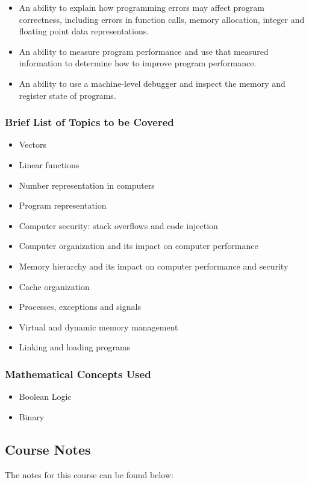 {\begin{highlight}[\CSPBCompSys]
\begin{itemize}
            \item An ability to explain how programming errors may affect program correctness, including errors in function calls, memory allocation, integer and floating point data representations.
            \item An ability to measure program performance and use that measured information to determine how to improve program performance.
            \item An ability to use a machine-level debugger and inspect the memory and register state of programs.
        \end{itemize}
        
        \subsubsection*{Brief List of Topics to be Covered}

        \begin{itemize}
            \item Vectors
            \item Linear functions
            \item Number representation in computers
            \item Program representation
            \item Computer security: stack overflows and code injection
            \item Computer organization and its impact on computer performance
            \item Memory hierarchy and its impact on computer performance and security
            \item Cache organization
            \item Processes, exceptions and signals
            \item Virtual and dynamic memory management
            \item Linking and loading programs
        \end{itemize}
        
        \subsubsection*{Mathematical Concepts Used}

        \begin{itemize}
            \item Boolean Logic
            \item Binary
        \end{itemize}
    \end{highlight}
}

\subsection{Course Notes}

The notes for this course can be found below: 
